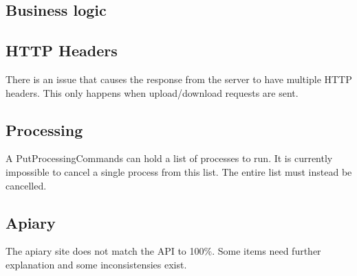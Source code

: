 \subsection{Business logic}

\subsection{HTTP Headers}

There is an issue that causes the response from the server to have multiple HTTP headers. This only happens when upload/download requests are sent.

\subsection{Processing}

A PutProcessingCommands can hold a list of processes to run. It is currently impossible to cancel a single process from this list. The entire list must instead be cancelled.

\subsection{Apiary}

The apiary site does not match the API to 100\%. Some items need further explanation and some inconsistensies exist.
